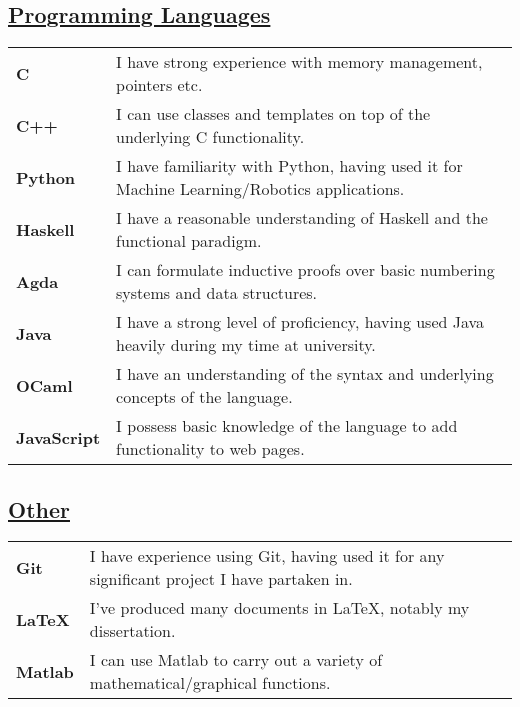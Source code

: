 \documentclass[11pt]{article}
\begin{document}
		\subsection*{\underline{Programming Languages}}
		\renewcommand{\arraystretch}{1.3}%
		\begin{tabular}[20pt]{ll}
			\textbf{C} & I have strong experience with memory management, pointers etc. \\
			\textbf{C++} & I can use classes and templates on top of the underlying C functionality. \\
			\textbf{Python} & I have familiarity with Python, having used it for Machine Learning/Robotics applications. \\
			\textbf{Haskell} & I have a reasonable understanding of Haskell and the functional paradigm.\\
			\textbf{Agda} & I can formulate inductive proofs over basic numbering systems and data structures.\\
			 \textbf{Java} &  I have a strong level of proficiency, having used Java heavily during my time at university.\\
			 \textbf{OCaml} & I have an understanding of the syntax and underlying concepts of the language.\\
			\textbf{JavaScript} &  I possess basic knowledge of the language to add functionality to web pages.\\
		\end{tabular} 
		\subsection*{\underline{Other}}
		\renewcommand{\arraystretch}{1.3}%
		\begin{tabular}{ll}
			 \textbf{Git} & I have experience using Git, having used it for any significant project I have partaken in.\\
			\textbf{LaTeX} & I've produced many documents in LaTeX, notably my dissertation.\\
			\textbf{Matlab} & I can use Matlab to carry out a variety of mathematical/graphical functions.\\
		\end{tabular}
	
\end{document}
